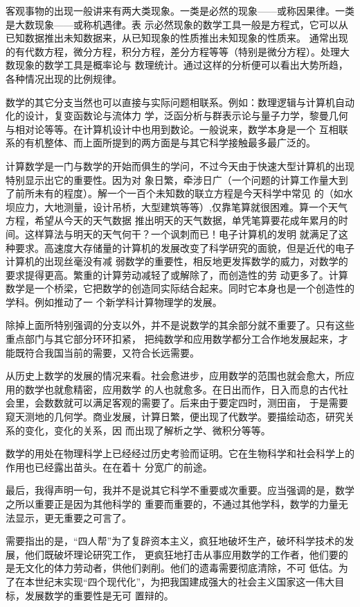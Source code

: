 \documentclass[twoside,openright,headings=optiontohead]{ctexbook} %
\begin{document}
{客观事物的出现一般讲来有两大类现象。一类是必然的现象------或称因果律。一类是大数现象------或称机遇律。表
示必然现象的数学工具一般是方程式，它可以从已知数据推出未知数据来，从已知现象的性质推出未知现象的性质来。
通常出现的有代数方程，微分方程，积分方程，差分方程等等（特别是微分方程）。处理大数现象的数学工具是概率论与
数理统计。通过这样的分析便可以看出大势所趋，各种情况出现的比例规律。

数学的其它分支当然也可以直接与实际问题相联系。例如：数理逻辑与计算机自动化的设计，复变函数论与流体力
学，泛函分析与群表示论与量子力学，黎曼几何与相对论等等。在计算机设计中也用到数论。一般说来，数学本身是一个
互相联系的有机整体、而上面所提到的两方面是与其它科学接触最多最广泛的。

计算数学是一门与数学的开始而俱生的学问，不过今天由于快速大型计算机的出现特别显示出它的重要性。因为对
象日繁，牵涉日广（一个问题的计算工作量大到了前所未有的程度）。解一个一百个未知数的联立方程是今天科学中常见
的（如水坝应力，大地测量，设计吊桥，大型建筑等等）,仅靠笔算就很困难。算一个天气方程，希望从今天的天气数据
推出明天的天气数据，单凭笔算要花成年累月的时间。这样算法与明天的天气何干？一个讽刺而已！电子计算机的发明
就满足了这种要求。高速度大存储量的计算机的发展改变了科学研究的面貌，但是近代的电子计算机的出现丝毫没有减
弱数学的重要性，相反地更发挥数学的威力，对数学的要求提得更高。繁重的计算劳动减轻了或解除了，而创造性的劳
动更多了。计算数学是一个桥梁，它把数学的创造同实际结合起来。同时它本身也是一个创造性的学科。例如推动了一
个新学科计算物理学的发展。

除掉上面所特别强调的分支以外，并不是说数学的其余部分就不重要了。只有这些重点部门与其它部分环环扣紧，
把纯数学和应用数学都分工合作地发展起来，才能既符合我国当前的需要，又符合长远需要。

从历史上数学的发展的情况来看。社会愈进步，应用数学的范围也就会愈大，所应用的数学也就愈精密，应用数学
的人也就愈多。在日出而作，日入而息的古代社会里，会数数就可以满足客观的需要了。后来由于要定四时，测田亩，
于是需要窥天测地的几何学。商业发展，计算日繁，便出现了代数学。要描绘动态，研究关系的变化，变化的关系，因
而出现了解析之学、微积分等等。

数学的用处在物理科学上已经经过历史考验而证明。它在生物科学和社会科学上的作用也已经露出苗头。在在着十
分宽广的前途。

最后，我得声明一句，我并不是说其它科学不重要或次重要。应当强调的是，数学之所以重要正是因为其他科学的
重要而重要的，不通过其他学科，数学的力量无法显示，更无重要之可言了。

需要指出的是，``四人帮''为了复辟资本主义，疯狂地破坏生产，破坏科学技术的发展，他们既破坏理论研究工作，
更疯狂地打击从事应用数学的工作者，他们要的是无文化的体力劳动者，供他们剥削。他们的遗毒需要彻底清除，不可
低估。为了在本世纪末实现``四个现代化''，为把我国建成强大的社会主义国家这一伟大目标，发展数学的重要性是无可
置辩的。

}
\end{document}
